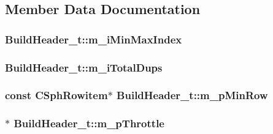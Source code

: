 \subsection{Member Data Documentation}
\hypertarget{structBuildHeader__t_a2d353f7e911f1f663fb06299c05f26eb}{
\subsubsection[{m\-\_\-i\-Min\-Max\-Index}]{ Build\-Header\-\_\-t\-::m\-\_\-i\-Min\-Max\-Index}}\label{structBuildHeader__t_a2d353f7e911f1f663fb06299c05f26eb}
\hypertarget{structBuildHeader__t_a0f3af6b2ee921651242450b275dea9ed}{
\subsubsection[{m\-\_\-i\-Total\-Dups}]{ Build\-Header\-\_\-t\-::m\-\_\-i\-Total\-Dups}}\label{structBuildHeader__t_a0f3af6b2ee921651242450b275dea9ed}
\hypertarget{structBuildHeader__t_a170ef51d4ac021e3f101654529064d08}{
\subsubsection[{m\-\_\-p\-Min\-Row}]{\setlength{\rightskip}{0pt plus 5cm}const {\bf C\-Sph\-Rowitem}$\ast$ Build\-Header\-\_\-t\-::m\-\_\-p\-Min\-Row}}\label{structBuildHeader__t_a170ef51d4ac021e3f101654529064d08}
\hypertarget{structBuildHeader__t_abea935c8fd6e25d76bec5d8d2fce2ac9}{
\subsubsection[{m\-\_\-p\-Throttle}]{$\ast$ Build\-Header\-\_\-t\-::m\-\_\-p\-Throttle}}\label{structBuildHeader__t_abea935c8fd6e25d76bec5d8d2fce2ac9}
